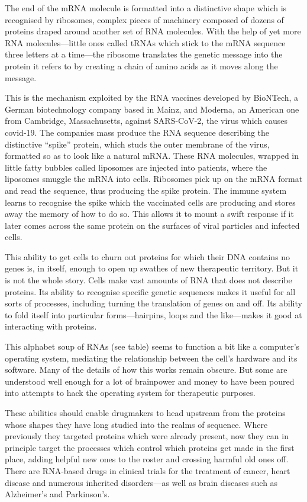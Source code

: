 \documentclass{article}
\begin{document}
The end of the mRNA molecule is formatted into a distinctive shape which is recognised by ribosomes, complex pieces of machinery composed of dozens of proteins draped around another set of RNA molecules. With the help of yet more RNA molecules---little ones called tRNAs which stick to the mRNA sequence three letters at a time---the ribosome translates the genetic message into the protein it refers to by creating a chain of amino acids as it moves along the message. 

This is the mechanism exploited by the RNA vaccines developed by BioNTech, a German biotechnology company based in Mainz, and Moderna, an American one from Cambridge, Massachusetts, against SARS-CoV-2, the virus which causes covid-19. The companies mass produce the RNA sequence describing the distinctive ``spike'' protein, which studs the outer membrane of the virus, formatted so as to look like a natural mRNA. These RNA molecules, wrapped in little fatty bubbles called liposomes are injected into patients, where the liposomes smuggle the mRNA into cells. Ribosomes pick up on the mRNA format and read the sequence, thus producing the spike protein. The immune system learns to recognise the spike which the vaccinated cells are producing and stores away the memory of how to do so. This allows it to mount a swift response if it later comes across the same protein on the surfaces of viral particles and infected cells. 

This ability to get cells to churn out proteins for which their DNA contains no genes is, in itself, enough to open up swathes of new therapeutic territory. But it is not the whole story. Cells make vast amounts of RNA that does not describe proteins. Its ability to recognise specific genetic sequences makes it useful for all sorts of processes, including turning the translation of genes on and off. Its ability to fold itself into particular forms---hairpins, loops and the like---makes it good at interacting with proteins. 

This alphabet soup of RNAs (see table) seems to function a bit like a computer's operating system, mediating the relationship between the cell's hardware and its software. Many of the details of how this works remain obscure. But some are understood well enough for a lot of brainpower and money to have been poured into attempts to hack the operating system for therapeutic purposes. 

These abilities should enable drugmakers to head upstream from the proteins whose shapes they have long studied into the realms of sequence. Where previously they targeted proteins which were already present, now they can in principle target the processes which control which proteins get made in the first place, adding helpful new ones to the roster and crossing harmful old ones off. There are RNA-based drugs in clinical trials for the treatment of cancer, heart disease and numerous inherited disorders---as well as brain diseases such as Alzheimer's and Parkinson's. 
\end{document}

